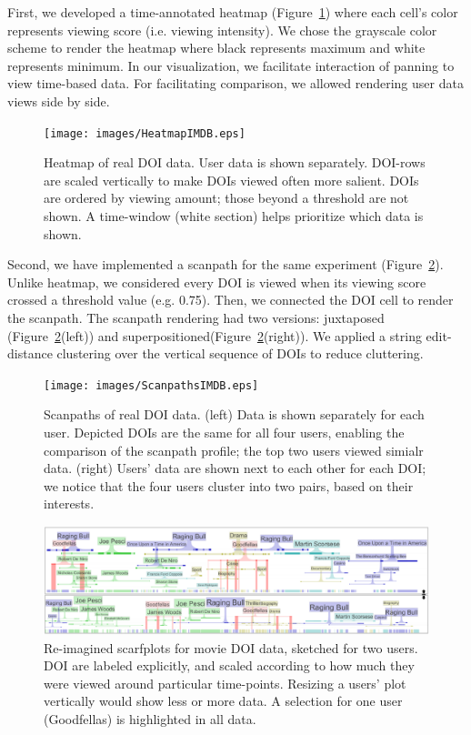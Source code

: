 First, we developed a time-annotated heatmap (Figure~\ref{fig:HeatmapIMDB}) where each cell's color represents viewing score (i.e. viewing intensity). We chose the grayscale color scheme to render the heatmap where black represents maximum and white represents minimum. In our visualization, we facilitate interaction of panning to view time-based data. For facilitating comparison, we allowed rendering user data views side by side. 
\begin{figure}[htb]
  \centering
	\texttt{[image: images/HeatmapIMDB.eps]}
  \caption{Heatmap of real DOI data. User data is shown separately. DOI-rows are scaled vertically to make DOIs viewed often more salient. DOIs are ordered by viewing amount; those beyond a threshold are not shown.
  A time-window (white section) helps prioritize which data is shown.}
	\label{fig:HeatmapIMDB}
\end{figure}

Second, we have implemented a scanpath for the same experiment (Figure~\ref{fig:ScanpathsIMDB}). Unlike heatmap, we considered every DOI is viewed when its viewing score crossed a threshold value (e.g. 0.75). Then, we connected the DOI cell to render the scanpath. The scanpath rendering had two versions: juxtaposed (Figure~\ref{fig:ScanpathsIMDB}(left)) and superpositioned(Figure~\ref{fig:ScanpathsIMDB}(right)). We applied a string edit-distance clustering over the vertical sequence of DOIs to reduce cluttering. 
\begin{figure}[!htb]
  \centering
  \texttt{[image: images/ScanpathsIMDB.eps]}
  \caption{Scanpaths of real DOI data. (left) Data is shown separately for each user. Depicted DOIs are the same for all four users, enabling the comparison of the scanpath profile; the top two users viewed simialr data. (right) Users' data are shown next to each other for each DOI; we notice that the four users cluster into two pairs, based on their interests.}
	\label{fig:ScanpathsIMDB}
\end{figure}

\begin{figure}
  \centering
  \includegraphics[width=\linewidth]{images/ScarfsIMDB.eps}
  \caption{Re-imagined scarfplots for movie DOI data, sketched for two users. DOI are labeled explicitly, and scaled according to how much they were viewed around particular time-points. Resizing a users' plot vertically would show less or more data. A selection for one user (Goodfellas) is highlighted in all data. }
	\label{fig:ScarfsIMDB}
\end{figure}

